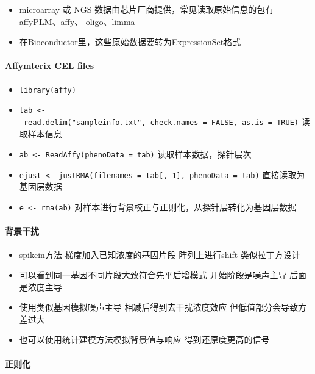 \documentclass[]{book}
\providecommand{\tightlist}{%
  \setlength{\itemsep}{0pt}\setlength{\parskip}{0pt}}
\let\oldparagraph\paragraph
\renewcommand{\paragraph}[1]{\oldparagraph{#1}\mbox{}}
\begin{document}
\begin{itemize}
\tightlist
\item
  microarray 或 NGS 数据由芯片厂商提供，常见读取原始信息的包有affyPLM、affy、 oligo、limma
\item
  在Bioconductor里，这些原始数据要转为ExpressionSet格式
\end{itemize}

\hypertarget{affymterix-cel-files}{%
\paragraph{Affymterix CEL files}\label{affymterix-cel-files}}

\begin{itemize}
\tightlist
\item
  \texttt{library(affy)}
\item
  \texttt{tab\ \textless{}-\ read.delim("sampleinfo.txt",\ check.names\ =\ FALSE,\ as.is\ =\ TRUE)} 读取样本信息
\item
  \texttt{ab\ \textless{}-\ ReadAffy(phenoData\ =\ tab)} 读取样本数据，探针层次
\item
  \texttt{ejust\ \textless{}-\ justRMA(filenames\ =\ tab{[},\ 1{]},\ phenoData\ =\ tab)} 直接读取为基因层数据
\item
  \texttt{e\ \textless{}-\ rma(ab)} 对样本进行背景校正与正则化，从探针层转化为基因层数据
\end{itemize}

\hypertarget{ux80ccux666fux5e72ux6270}{%
\paragraph{背景干扰}\label{ux80ccux666fux5e72ux6270}}

\begin{itemize}
\tightlist
\item
  spikein方法 梯度加入已知浓度的基因片段 阵列上进行shift 类似拉丁方设计
\item
  可以看到同一基因不同片段大致符合先平后增模式 开始阶段是噪声主导 后面是浓度主导
\item
  使用类似基因模拟噪声主导 相减后得到去干扰浓度效应 但低值部分会导致方差过大
\item
  也可以使用统计建模方法模拟背景值与响应 得到还原度更高的信号
\end{itemize}

\hypertarget{ux6b63ux5219ux5316}{%
\paragraph{正则化}\label{ux6b63ux5219ux5316}}
\end{document}
